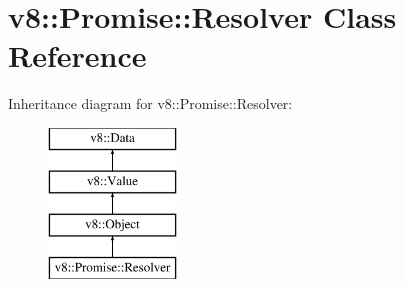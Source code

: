 \hypertarget{classv8_1_1_promise_1_1_resolver}{}\section{v8\+:\+:Promise\+:\+:Resolver Class Reference}
\label{classv8_1_1_promise_1_1_resolver}
Inheritance diagram for v8\+:\+:Promise\+:\+:Resolver\+:\begin{figure}[H]
\begin{center}
\leavevmode
\includegraphics[height=4.000000cm]{classv8_1_1_promise_1_1_resolver}
\end{center}
\end{figure}
